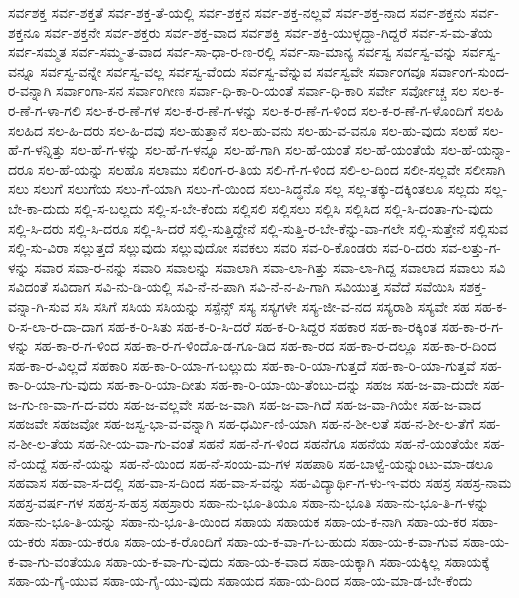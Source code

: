 {ಸರ್ವಶಕ್ತ
ಸರ್ವ-ಶಕ್ತತೆ
ಸರ್ವ-ಶಕ್ತ-ತೆ-ಯಲ್ಲಿ
ಸರ್ವ-ಶಕ್ತನ
ಸರ್ವ-ಶಕ್ತ-ನಲ್ಲವೆ
ಸರ್ವ-ಶಕ್ತ-ನಾದ
ಸರ್ವ-ಶಕ್ತನು
ಸರ್ವ-ಶಕ್ತನೂ
ಸರ್ವ-ಶಕ್ತನೇ
ಸರ್ವ-ಶಕ್ತರು
ಸರ್ವ-ಶಕ್ತ-ವಾದ
ಸರ್ವಶಕ್ತಿ
ಸರ್ವ-ಶಕ್ತಿ-ಯುಳ್ಳದ್ದಾ-ಗಿದ್ದರೆ
ಸರ್ವ-ಸ-ಮ-ತೆಯ
ಸರ್ವ-ಸಮ್ಮತ
ಸರ್ವ-ಸಮ್ಮ-ತ-ವಾದ
ಸರ್ವ-ಸಾ-ಧಾ-ರ-ಣ-ರಲ್ಲಿ
ಸರ್ವ-ಸಾ-ಮಾನ್ಯ
ಸರ್ವಸ್ವ
ಸರ್ವಸ್ವ-ವನ್ನು
ಸರ್ವಸ್ವ-ವನ್ನೂ
ಸರ್ವಸ್ವ-ವನ್ನೇ
ಸರ್ವಸ್ವ-ವಲ್ಲ
ಸರ್ವಸ್ವ-ವೆಂದು
ಸರ್ವಸ್ವ-ವೆನ್ನುವ
ಸರ್ವಸ್ವವೇ
ಸರ್ವಾಂಗವೂ
ಸರ್ವಾಂಗ-ಸುಂದ-ರ-ವನ್ನಾಗಿ
ಸರ್ವಾಂಗಾ-ಸನ
ಸರ್ವಾಂಗೀಣ
ಸರ್ವಾ-ಧಿ-ಕಾ-ರಿ-ಯಂತೆ
ಸರ್ವಾ-ಧಿ-ಕಾರಿ
ಸರ್ವೇ
ಸರ್ವೋಚ್ಚ
ಸಲ
ಸಲ-ಕ-ರ-ಣೆ-ಗ-ಳಾ-ಗಲಿ
ಸಲ-ಕ-ರ-ಣೆ-ಗಳ
ಸಲ-ಕ-ರ-ಣೆ-ಗ-ಳನ್ನು
ಸಲ-ಕ-ರ-ಣೆ-ಗ-ಳಿಂದ
ಸಲ-ಕ-ರ-ಣೆ-ಗ-ಳೊಂದಿಗೆ
ಸಲಹಿ
ಸಲಹಿದ
ಸಲ-ಹಿ-ದರು
ಸಲ-ಹಿ-ದವು
ಸಲ-ಹುತ್ತಾನೆ
ಸಲ-ಹು-ವನು
ಸಲ-ಹು-ವ-ವನೂ
ಸಲ-ಹು-ವುದು
ಸಲಹೆ
ಸಲ-ಹೆ-ಗ-ಳನ್ನಿತ್ತು
ಸಲ-ಹೆ-ಗ-ಳನ್ನು
ಸಲ-ಹೆ-ಗ-ಳನ್ನೂ
ಸಲ-ಹೆ-ಗಾಗಿ
ಸಲ-ಹೆ-ಯಂತೆ
ಸಲ-ಹೆ-ಯಂತೆಯೆ
ಸಲ-ಹೆ-ಯನ್ನಾ-ದರೂ
ಸಲ-ಹೆ-ಯನ್ನು
ಸಲಹೊ
ಸಲಾಮು
ಸಲಿಂಗ-ರ-ತಿಯ
ಸಲಿ-ಗೆ-ಗ-ಳಿಂದ
ಸಲಿ-ಲ-ದಿಂದ
ಸಲೀ-ಸಲ್ಲವೇ
ಸಲೀಸಾಗಿ
ಸಲು
ಸಲುಗೆ
ಸಲುಗೆಯ
ಸಲು-ಗೆ-ಯಾಗಿ
ಸಲು-ಗೆ-ಯಿಂದ
ಸಲು-ಸಿದ್ಧನೊ
ಸಲ್ಲ
ಸಲ್ಲ-ತಕ್ಕು-ದಕ್ಕಿಂತಲೂ
ಸಲ್ಲದು
ಸಲ್ಲ-ಬೇ-ಕಾ-ದುದು
ಸಲ್ಲಿ-ಸ-ಬಲ್ಲದು
ಸಲ್ಲಿ-ಸ-ಬೇ-ಕೆಂದು
ಸಲ್ಲಿಸಲಿ
ಸಲ್ಲಿಸಲು
ಸಲ್ಲಿಸಿ
ಸಲ್ಲಿಸಿದ
ಸಲ್ಲಿ-ಸಿ-ದಂತಾ-ಗು-ವುದು
ಸಲ್ಲಿ-ಸಿ-ದರು
ಸಲ್ಲಿ-ಸಿ-ದರೂ
ಸಲ್ಲಿ-ಸಿ-ದರೆ
ಸಲ್ಲಿ-ಸುತ್ತಿದ್ದೇನೆ
ಸಲ್ಲಿ-ಸುತ್ತಿ-ರ-ಬೇ-ಕೆನ್ನು-ವಾ-ಗಲೇ
ಸಲ್ಲಿ-ಸುತ್ತೇನೆ
ಸಲ್ಲಿಸುವ
ಸಲ್ಲಿ-ಸು-ವಿರಾ
ಸಲ್ಲುತ್ತದೆ
ಸಲ್ಲುವುದು
ಸಲ್ಲುವುದೋ
ಸವಕಲು
ಸವರಿ
ಸವ-ರಿ-ಕೊಂಡರು
ಸವ-ರಿ-ದರು
ಸವ-ಲತ್ತು-ಗ-ಳನ್ನು
ಸವಾರ
ಸವಾ-ರ-ನನ್ನು
ಸವಾರಿ
ಸವಾಲನ್ನು
ಸವಾಲಾಗಿ
ಸವಾ-ಲಾ-ಗಿತ್ತು
ಸವಾ-ಲಾ-ಗಿದ್ದ
ಸವಾಲಾದ
ಸವಾಲು
ಸವಿ
ಸವಿದಂತೆ
ಸವಿದಾಗ
ಸವಿ-ನು-ಡಿ-ಯಲ್ಲಿ
ಸವಿ-ನೆ-ನ-ಪಾಗಿ
ಸವಿ-ನೆ-ನ-ಪಿ-ಗಾಗಿ
ಸವಿಯುತ್ತ
ಸವೆದೆ
ಸವೆಯಿಸಿ
ಸಶಕ್ತ-ವನ್ನಾ-ಗಿ-ಸುವ
ಸಸಿ
ಸಸಿಗೆ
ಸಸಿಯ
ಸಸಿಯನ್ನು
ಸಸ್ಪೆನ್ಸ್
ಸಸ್ಯ
ಸಸ್ಯಗಳೇ
ಸಸ್ಯ-ಜೀ-ವ-ನದ
ಸಸ್ಯರಾಶಿ
ಸಸ್ಯವೇ
ಸಹ
ಸಹ-ಕ-ರಿ-ಸ-ಲಾ-ರ-ದಾ-ದಾಗ
ಸಹ-ಕ-ರಿ-ಸಿತು
ಸಹ-ಕ-ರಿ-ಸಿ-ದರೆ
ಸಹ-ಕ-ರಿ-ಸಿದ್ದರ
ಸಹಕಾರ
ಸಹ-ಕಾ-ರಕ್ಕಿಂತ
ಸಹ-ಕಾ-ರ-ಗ-ಳನ್ನು
ಸಹ-ಕಾ-ರ-ಗ-ಳಿಂದ
ಸಹ-ಕಾ-ರ-ಗ-ಳಿಂದೊ-ಡ-ಗೂ-ಡಿದ
ಸಹ-ಕಾ-ರದ
ಸಹ-ಕಾ-ರ-ದಲ್ಲೂ
ಸಹ-ಕಾ-ರ-ದಿಂದ
ಸಹ-ಕಾ-ರ-ವಿಲ್ಲದೆ
ಸಹಕಾರಿ
ಸಹ-ಕಾ-ರಿ-ಯಾ-ಗ-ಬಲ್ಲುದು
ಸಹ-ಕಾ-ರಿ-ಯಾ-ಗುತ್ತದೆ
ಸಹ-ಕಾ-ರಿ-ಯಾ-ಗುತ್ತವೆ
ಸಹ-ಕಾ-ರಿ-ಯಾ-ಗು-ವುದು
ಸಹ-ಕಾ-ರಿ-ಯಾ-ದೀತು
ಸಹ-ಕಾ-ರಿ-ಯಾ-ಯಿ-ತೆಂಬು-ದನ್ನು
ಸಹಜ
ಸಹ-ಜ-ವಾ-ದುದೇ
ಸಹ-ಜ-ಗು-ಣ-ವಾ-ಗ-ದ-ವರು
ಸಹ-ಜ-ವಲ್ಲವೇ
ಸಹ-ಜ-ವಾಗಿ
ಸಹ-ಜ-ವಾ-ಗಿದೆ
ಸಹ-ಜ-ವಾ-ಗಿಯೇ
ಸಹ-ಜ-ವಾದ
ಸಹಜವೇ
ಸಹಜವೋ
ಸಹ-ಜಸ್ವ-ಭಾ-ವ-ವನ್ನಾಗಿ
ಸಹ-ಧರ್ಮಿ-ಣಿ-ಯಾಗಿ
ಸಹ-ನ-ಶೀ-ಲತೆ
ಸಹ-ನ-ಶೀ-ಲ-ತೆಗೆ
ಸಹ-ನ-ಶೀ-ಲ-ತೆಯ
ಸಹ-ನೀ-ಯ-ವಾ-ಗು-ವಂತೆ
ಸಹನೆ
ಸಹ-ನೆ-ಗ-ಳಿಂದ
ಸಹನೆಗೂ
ಸಹನೆಯ
ಸಹ-ನೆ-ಯಂತೆಯೇ
ಸಹ-ನೆ-ಯದ್ದೆ
ಸಹ-ನೆ-ಯನ್ನು
ಸಹ-ನೆ-ಯಿಂದ
ಸಹ-ನೆ-ಸಂಯ-ಮ-ಗಳ
ಸಹಪಾಠಿ
ಸಹ-ಬಾಳ್ವೆ-ಯನ್ನುಂಟು-ಮಾ-ಡಲೂ
ಸಹವಾಸ
ಸಹ-ವಾ-ಸ-ದಲ್ಲಿ
ಸಹ-ವಾ-ಸ-ದಿಂದ
ಸಹ-ವಾ-ಸ-ವನ್ನು
ಸಹ-ವಿದ್ಯಾರ್ಥಿ-ಗ-ಳು-ಇ-ವರು
ಸಹಸ್ರ
ಸಹಸ್ರ-ನಾಮ
ಸಹಸ್ರ-ವರ್ಷ-ಗಳ
ಸಹಸ್ರ-ಸ-ಹಸ್ರ
ಸಹಸ್ರಾರು
ಸಹಾ-ನು-ಭೂ-ತಿಯೂ
ಸಹಾ-ನು-ಭೂತಿ
ಸಹಾ-ನು-ಭೂ-ತಿ-ಗ-ಳನ್ನು
ಸಹಾ-ನು-ಭೂ-ತಿ-ಯನ್ನು
ಸಹಾ-ನು-ಭೂ-ತಿ-ಯಿಂದ
ಸಹಾಯ
ಸಹಾಯಕ
ಸಹಾ-ಯ-ಕ-ನಾಗಿ
ಸಹಾ-ಯ-ಕರ
ಸಹಾ-ಯ-ಕರು
ಸಹಾ-ಯ-ಕರೂ
ಸಹಾ-ಯ-ಕ-ರೊಂದಿಗೆ
ಸಹಾ-ಯ-ಕ-ವಾ-ಗ-ಬ-ಹುದು
ಸಹಾ-ಯ-ಕ-ವಾ-ಗುವ
ಸಹಾ-ಯ-ಕ-ವಾ-ಗು-ವಂತೆಯೂ
ಸಹಾ-ಯ-ಕ-ವಾ-ಗು-ವುದು
ಸಹಾ-ಯ-ಕ-ವಾದ
ಸಹಾ-ಯಕ್ಕಾಗಿ
ಸಹಾ-ಯಕ್ಕಿಲ್ಲ
ಸಹಾಯಕ್ಕೆ
ಸಹಾ-ಯ-ಗೈ-ಯುವ
ಸಹಾ-ಯ-ಗೈ-ಯು-ವುದು
ಸಹಾಯದ
ಸಹಾ-ಯ-ದಿಂದ
ಸಹಾ-ಯ-ಮಾ-ಡ-ಬೇ-ಕೆಂದು
}

